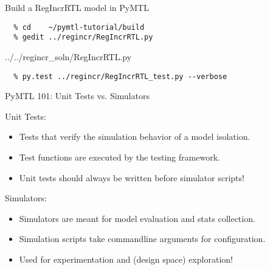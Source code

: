 \begin{task}\begin{frame}[fragile]{Build a RegIncrRTL model in PyMTL}
\vspace{-0.25in}
\begin{verbatim}
  % cd    ~/pymtl-tutorial/build
  % gedit ../regincr/RegIncrRTL.py
\end{verbatim}

\vspace{-0.3in}
%
{../../regincr_soln/RegIncrRTL.py}%

\vspace{-0.3in}
\begin{verbatim}
  % py.test ../regincr/RegIncrRTL_test.py --verbose
\end{verbatim}
\end{frame}
\end{task}

\begin{frame}{PyMTL 101: Unit Tests vs. Simulators}

Unit Tests: 
\begin{itemize}
  \item Tests that verify the simulation behavior of a model isolation.
  \item Test functions are executed by the  testing framework.
  \item Unit tests should always be written before simulator scripts!
\end{itemize}

\vspace{0.2in}

Simulators: 
\begin{itemize}
  \item Simulators are meant for model evaluation and stats collection.
  \item Simulation scripts take commandline arguments for configuration.
  \item Used for experimentation and (design space) exploration!
\end{itemize}

\end{frame}

